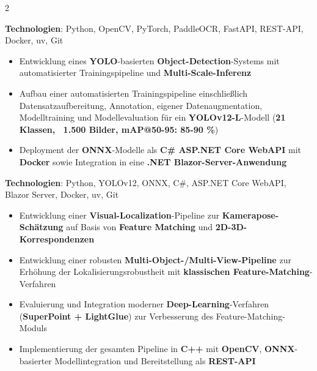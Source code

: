 \documentclass[10pt,a4paper,withhyper]{../altacv}
\begin{document}
\begin{paracol}{2}
  \vspace{0.5em}

  \textbf{Technologien}: Python, OpenCV, PyTorch, PaddleOCR, FastAPI, REST-API, Docker, uv, Git

  \vspace{0.5em}


  \vspace{0.5em}

  \begin{itemize}
    \item Entwicklung eines \textbf{YOLO}-basierten \textbf{Object-Detection}-Systems mit automatisierter Trainingspipeline und \textbf{Multi-Scale-Inferenz}
    \item Aufbau einer automatisierten Trainingspipeline einschließlich Datensatzaufbereitung, Annotation, eigener Datenaugmentation, Modelltraining und Modellevaluation für ein \textbf{YOLOv12-L}-Modell (\textbf{21 Klassen, ~1.500 Bilder, mAP@50-95: 85-90 \%})
    \item Deployment der \textbf{ONNX}-Modelle als \textbf{C\# ASP.NET Core WebAPI} mit \textbf{Docker} sowie Integration in eine \textbf{.NET Blazor-Server-Anwendung}
  \end{itemize}

  \vspace{0.5em}

  \textbf{Technologien}: Python, YOLOv12, ONNX, C\#, ASP.NET Core WebAPI, Blazor Server, Docker, uv, Git

  \vspace{0.5em}


  \vspace{0.5em}

  \begin{itemize}
    \item Entwicklung einer \textbf{Visual-Localization}-Pipeline zur \textbf{Kamerapose-Schätzung} auf Basis von \textbf{Feature Matching} und \textbf{2D-3D-Korrespondenzen}
    \item Entwicklung einer robusten \textbf{Multi-Object-/Multi-View-Pipeline} zur Erhöhung der Lokalisierungsrobustheit mit \textbf{klassischen Feature-Matching}-Verfahren
    \item Evaluierung und Integration moderner \textbf{Deep-Learning}-Verfahren (\textbf{SuperPoint + LightGlue}) zur Verbesserung des Feature-Matching-Moduls
    \item Implementierung der gesamten Pipeline in \textbf{C++} mit \textbf{OpenCV}, \textbf{ONNX}-basierter Modellintegration und Bereitstellung als \textbf{REST-API}
  \end{itemize}


\end{paracol}
\end{document}
